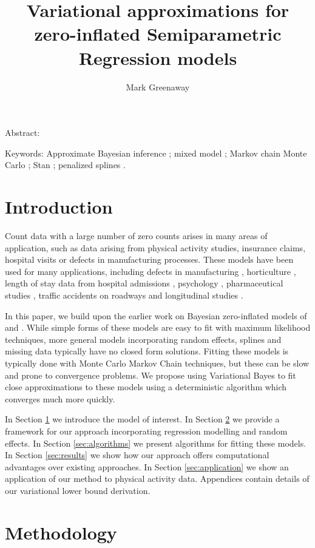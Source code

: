 \documentclass{article}[12pt]
\title{Variational approximations for zero-inflated Semiparametric Regression
			 models}
\author{Mark Greenaway}
\begin{document}
\maketitle

Abstract:

Keywords: Approximate Bayesian inference ; mixed model ; Markov chain Monte Carlo ; Stan ; penalized splines .

\section{Introduction}
\label{sec:introduction}

Count data with a large number of zero counts arises in many areas of application, such as data arising from
physical activity studies, insurance claims, hospital visits or defects in manufacturing processes. These
models have been used for many applications, including defects in manufacturing \cite{lambert1992},
horticulture \cite{BIOM:BIOM1030} \cite{Hall2000}, length of stay data from hospital admissions
\cite{BIMJ:BIMJ200390024}, psychology \cite{JOFP:rethink}, pharmaceutical studies \cite{Min01042005}, traffic
accidents on roadways \cite{Shankar1997829} and longitudinal studies \cite{LeeWangScottYauMcLachlan2006}.

In this paper, we build upon the earlier work on Bayesian zero-inflated models of \cite{Ghosh20061360} and
\cite{VatsaWilson2014}. While simple forms of these models are easy to fit with maximum likelihood techniques,
more general models incorporating random effects, splines and missing data typically have no closed form
solutions. Fitting these models is typically done with Monte Carlo Markov Chain techniques, but these can be
slow and prone to convergence problems. We propose using Variational Bayes to fit close approximations to
these models using a deterministic algorithm which converges much more quickly.

In Section \ref{sec:introduction} we introduce the model of interest. In Section \ref{sec:methodology} we
provide a framework for our approach incorporating regression modelling and random effects. In Section
\ref{sec:algorithms} we present algorithms for fitting these models. In Section \ref{sec:results} we show how
our approach offers computational advantages over existing approaches. In Section \ref{sec:application} we
show an application of our method to physical activity data. Appendices contain details of our variational
lower bound derivation.

\section{Methodology}\label{sec:methodology}
\end{document}
